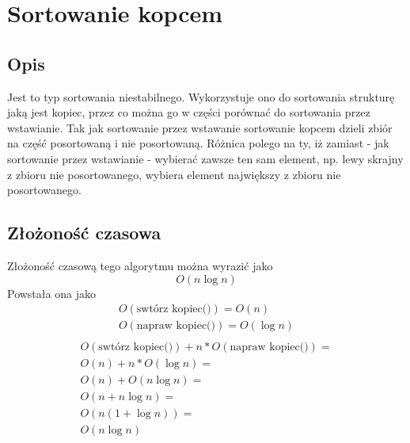 \documentclass[]{article}
\begin{document}
		
\pagebreak
\section{Sortowanie kopcem}
	\subsection{Opis}
		Jest to typ sortowania niestabilnego. Wykorzystuje ono do sortowania strukturę jaką jest kopiec, przez co można go w części porównać do sortowania przez wstawianie. Tak jak sortowanie przez wstawanie sortowanie kopcem dzieli zbiór na część posortowaną i nie posortowaną. Różnica polego na ty, iż zamiast - jak sortowanie przez wstawianie - wybierać zawsze ten sam element, np. lewy skrajny z zbioru nie posortowanego, wybiera element największy z zbioru nie posortowanego.
	\subsection{Złożoność czasowa}
		Złożoność czasową tego algorytmu można wyrazić jako
		\[
		O(n\log{n})
		\]
		Powstała ona jako
		\begin{gather*}
		O(\text{swtórz kopiec()}) = O(n) \\
		O(\text{napraw kopiec()}) = O(\log{n}) \\
		\end{gather*}
		\begin{multline*}
		O(\text{swtórz kopiec()}) + n * O(\text{napraw kopiec()}) = \\ O(n) + n * O(\log{n}) = \\ O(n) + O(n\log{n}) = \\ O( n + n\log{n}) = \\ O(n(1 + \log{n})) = \\ O(n\log{n})
		\end{multline*}
\end{document}
